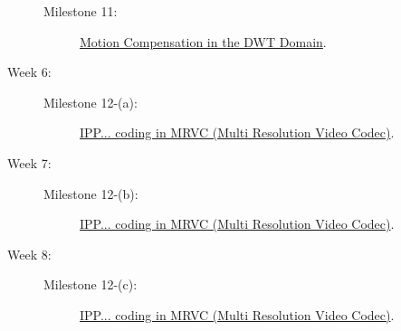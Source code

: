 \begin{description}
\begin{description}
  \item [Milestone 11:] \href{https://sistemas-multimedia.github.io/milestones/11-MC_in_DWT_domain/}{Motion Compensation in the DWT Domain}.
  \end{description}
\item [Week 6:]
  \begin{description}
  \item [Milestone 12-(a):] \href{https://sistemas-multimedia.github.io/milestones/12-IPP_coding/}{IPP... coding in MRVC (Multi Resolution Video Codec)}.
  \end{description}
\item [Week 7:]
  \begin{description}
  \item [Milestone 12-(b):] \href{https://sistemas-multimedia.github.io/milestones/12-IPP_coding/}{IPP... coding in MRVC (Multi Resolution Video Codec)}.
  \end{description}
\item [Week 8:]
  \begin{description}
  \item [Milestone 12-(c):] \href{https://sistemas-multimedia.github.io/milestones/12-IPP_coding/}{IPP... coding in MRVC (Multi Resolution Video Codec)}.
  \end{description}
\end{description}
